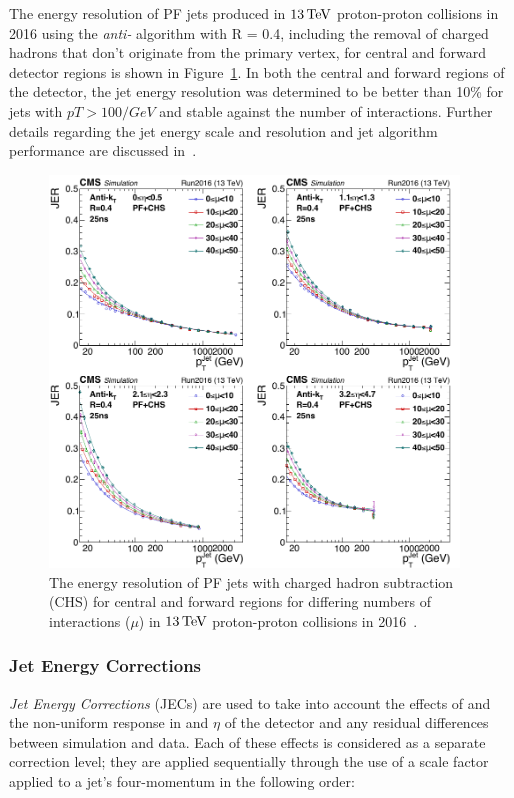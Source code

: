 The energy resolution of PF jets produced in $13\,\text{Te\hspace{-.08em}V}$ proton-proton collisions in 2016 using the \emph{anti-\kt} algorithm with R = 0.4, including the removal of charged hadrons that don't originate from the primary vertex, for central and forward detector regions is shown in Figure~\ref{fig:JERs}.
In both the central and forward regions of the detector, the jet energy resolution was determined to be better than 10\% for jets with $pT>100/GeV$ and stable against the number of \PU interactions.
Further details regarding the jet energy scale and resolution and jet algorithm performance are discussed in~\cite{Khachatryan:2016kdb,CMS:2017wyc}.

\begin{figure}[htbp]
\centering
\includegraphics[width=0.97\textwidth]{figs/data-mc/JER.pdf}
\caption{The energy resolution of PF jets with charged hadron subtraction (CHS) for central and forward regions for differing numbers of \PU interactions ($\mu$) in $13\,\text{Te\hspace{-.08em}V}$ proton-proton collisions in 2016~\cite{CMS-DP-2016-020}.}
\label{fig:JERs}
\end{figure}

\subsubsection{Jet Energy Corrections}\label{subsubsec:JECs}
\emph{Jet Energy Corrections} (JECs) are used to take into account the effects of \PU and the non-uniform response in \pT and $\eta$ of the detector and any residual differences between simulation and data.
Each of these effects is considered as a separate correction level; they are applied sequentially through the use of a scale factor applied to a jet's four-momentum in the following order:

